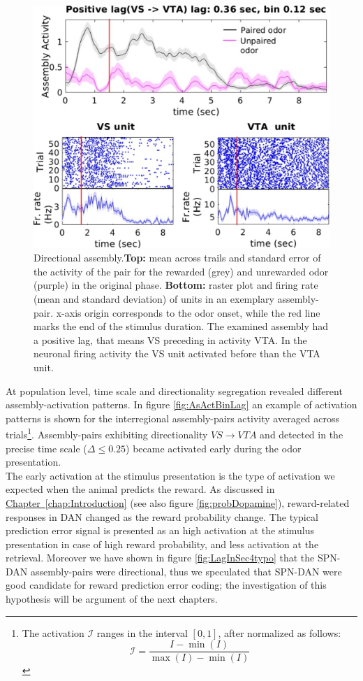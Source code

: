 \begin{figure}
    \centering
    \includegraphics[scale=0.6]{figures/DirectionalAsEx1.pdf}
    \caption{Directional assembly.\textbf{Top:} mean across trails and standard error of the activity of the pair for the rewarded (grey) and unrewarded odor (purple) in the original phase. \textbf{Bottom:} raster plot and firing rate (mean and standard deviation) of units in an exemplary assembly-pair. x-axis origin corresponds to the odor onset, while the red line marks the end of the stimulus duration. The examined assembly had a positive lag, that means VS preceding in activity VTA. In the neuronal firing activity the VS unit activated before than the VTA unit.}
    \label{fig:directional_assembly}
\end{figure}
At population level, time scale and directionality segregation revealed different assembly-activation patterns. In figure \ref{fig:AsActBinLag} an example of activation patterns is shown for the interregional assembly-pairs activity averaged across trials\footnote{The activation $\mathcal{I}$ ranges in the interval $[0,1]$, after normalized as follows:
\begin{equation}
    \mathcal{I} = \frac{I-\min(I)}{\max(I)-\min(I)}
    \label{eq:norm}
\end{equation}}. 
Assembly-pairs exhibiting directionality $VS \rightarrow VTA$ and detected in the precise time scale ($\Delta \le 0.25$) became activated early during the odor presentation.\\The early activation at the stimulus presentation is the type of activation we expected when the animal predicts the reward. As discussed in \hyperref[chap:Introduction]{Chapter~\ref*{chap:Introduction}} (see also figure \ref{fig:probDopamine}), reward-related responses in DAN changed as the reward probability change. The typical prediction error signal is presented as an high activation at the stimulus presentation in case of high reward probability, and less activation at the retrieval. Moreover we have shown in figure \ref{fig:LagInSec4typo} that the SPN-DAN assembly-pairs were directional, thus we speculated that SPN-DAN were good candidate for reward prediction error coding; the investigation of this hypothesis will be argument of the next chapters.\\
